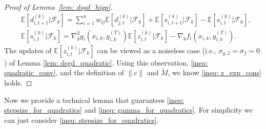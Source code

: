 \documentclass{article}
\theoremstyle{plain}
\theoremstyle{definition}
\theoremstyle{remark}
\newcommand{\E}{\mathbb{E}}
\newcommand{\F}{\mathcal{F}}
\begin{document}
\begin{proof}[Proof of Lemma~\ref{lem: dsgd_higp}]
\begin{align*}
        &\E\left[d_{i,t+1}^{(k)}|\F_k\right] =\sum_{i=1}^{n}w_{ij}\E\left[d_{j,t}^{(k)}|\F_k\right] + \E\left[s_{i,t+1}^{(k)}|\F_k\right] - \E\left[s_{i,t}^{(k)}|\F_k\right], \\
        &\E\left[s_{i,t}^{(k)}|\F_k\right] = \nabla_y^2g_i(x_{i,k},y_{i,k}^{(T)})\E\left[z_{i,t}^{(k)}|\F_k\right]- \nabla_yf_i(x_{i,k},y_{i,k}^{(T)}).
    \end{align*}
    The updates of $\E\left[z_{i,t}^{(k)}|\F_k\right]$ can be viewed as a noiseless case (i.e., $\sigma_{g,2} =\sigma_f = 0$) of Lemma \ref{lem: dsgd_quadratic}. Using this observation, \eqref{ineq: quadratic_conv}, and the definition of $\|c\|$ and $\tilde{M}$, we know \eqref{ineq: z_exp_cons} holds.
\end{proof}
Now we provide a technical lemma that guarantees \eqref{ineq: stepsize_for_quadratics} and \eqref{ineq: gamma_for_quadratics}. For simplicity we can just consider \eqref{ineq: stepsize_for_quadratics}.
\end{document}
